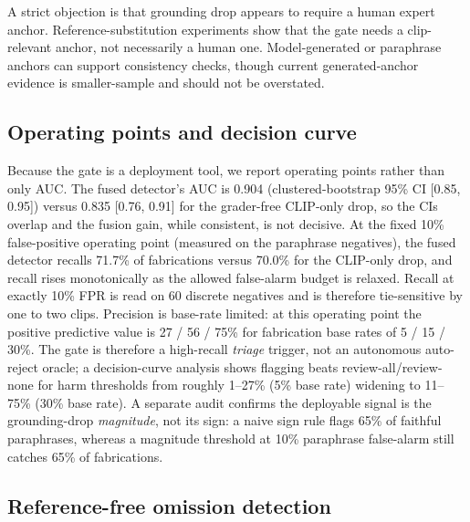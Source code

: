 \documentclass[10pt,twocolumn]{article}
\begin{document}
A strict objection is that grounding drop appears to require a human expert anchor. Reference-substitution experiments show that the gate needs a clip-relevant anchor, not necessarily a human one. Model-generated or paraphrase anchors can support consistency checks, though current generated-anchor evidence is smaller-sample and should not be overstated.


\subsection{Operating points and decision curve}

Because the gate is a deployment tool, we report operating points rather than only AUC. The fused detector's AUC is 0.904 (clustered-bootstrap 95\% CI [0.85, 0.95]) versus 0.835 [0.76, 0.91] for the grader-free CLIP-only drop, so the CIs overlap and the fusion gain, while consistent, is not decisive. At the fixed 10\% false-positive operating point (measured on the paraphrase negatives), the fused detector recalls 71.7\% of fabrications versus 70.0\% for the CLIP-only drop, and recall rises monotonically as the allowed false-alarm budget is relaxed. Recall at exactly 10\% FPR is read on 60 discrete negatives and is therefore tie-sensitive by one to two clips. Precision is base-rate limited: at this operating point the positive predictive value is 27 / 56 / 75\% for fabrication base rates of 5 / 15 / 30\%. The gate is therefore a high-recall \emph{triage} trigger, not an autonomous auto-reject oracle; a decision-curve analysis shows flagging beats review-all/review-none for harm thresholds from roughly 1--27\% (5\% base rate) widening to 11--75\% (30\% base rate). A separate audit confirms the deployable signal is the grounding-drop \emph{magnitude}, not its sign: a naive sign rule flags 65\% of faithful paraphrases, whereas a magnitude threshold at 10\% paraphrase false-alarm still catches 65\% of fabrications.

\subsection{Reference-free omission detection}
\end{document}
